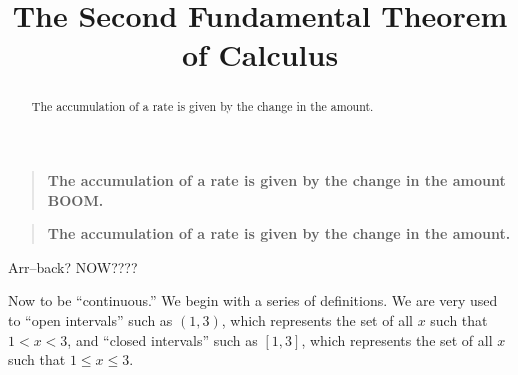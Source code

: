 \documentclass{ximera}
\title[Dig-In:]{The Second Fundamental Theorem of Calculus}
\begin{document}
\begin{abstract}
The accumulation of a rate is given by the change in the amount.
\end{abstract}
\maketitle

\begin{quote}\large\textbf{The \textcolor{green!70!black!70!blue}{accumulation} of a \textcolor{blue!70!green}{rate} is given by the \textcolor{purple!50!blue!90!black}{change in the amount BOOM}.}
\end{quote}
% 
\begin{quote}\large\textbf{The accumulation of a rate is given by the change in the amount.}
\end{quote}

Arr--back? NOW????

Now to be ``continuous.'' We begin with a series of definitions. We are
very used to ``open intervals'' such as $(1,3)$, which represents the set
of all $x$ such that $1<x<3$, and ``closed intervals'' such as
$[1,3]$, which represents the set of all $x$ such that $1\leq x\leq
3$. 
\end{document}

